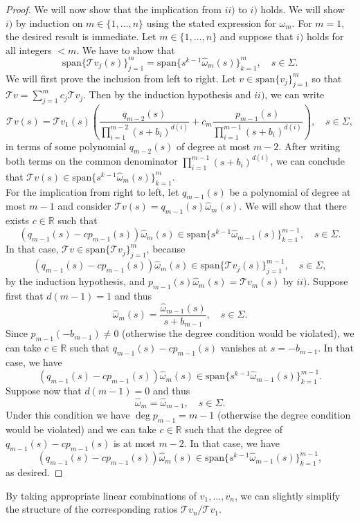 \documentclass[a4paper,12pt,oneside]{article}
\theoremstyle{definition}
\newcommand{\R}{\mathbb{R}}
\newcommand{\om}{\omega}
\newcommand{\spn}[1]{\text{span}\{#1\}}
\newcommand{\T}[1]{\mathcal{T}#1}
\begin{document}
\begin{proof}
    We will now show that the implication from $ii)$ to $i)$ holds. We will show $i)$ by induction on $m\in\{1,\dots,n\}$ using the stated expression for $\om_m$. For $m=1$, the desired result is immediate. Let $m\in\{1,\dots,n\}$ and suppose that $i)$ holds for all integers $<m$. We have to show that
        $$\spn{\T{v_j}(s)}_{j=1}^{m} = \spn{ s^{k-1} \hat{\om}_m(s)}_{k=1}^{m},\quad s\in\Sigma.$$
    We will first prove the inclusion from left to right. Let $v\in\spn{v_j}_{j=1}^m$ so that $ \T{v} = \sum_{j=1}^m c_j \T{v}_j $. Then by the induction hypothesis and $ii)$, we can write
        $$ \T{v}(s) = \T{v_1}(s) \left( \frac{q_{m-2}(s)}{\prod_{i=1}^{m-2} (s+b_i)^{d(i)}} + c_m \frac{p_{m-1}(s)}{\prod_{i=1}^{m-1} (s+b_i)^{d(i)}}\right),\quad s\in\Sigma, $$
    in terms of some polynomial $q_{m-2}(s)$ of degree at most $m-2$. After writing both terms on the common denominator $\prod_{i=1}^{m-1} (s+b_i)^{d(i)}$, we can conclude that $\T{v}(s)\in\spn{s^{k-1}\hat{\om}_m(s)}_{k=1}^m$. \\    
    For the implication from right to left, let $q_{m-1}(s)$ be a polynomial of degree at most $m-1$ and consider $\T{v}(s) = q_{m-1}(s) \hat{\om}_m(s)$. We will show that there exists $c\in\R$ such that 
    $$(q_{m-1}(s)-cp_{m-1}(s))\hat{\om}_m(s) \in\spn{s^{k-1}\hat{\om}_{m-1}(s)}_{k=1}^{m-1},\quad s\in\Sigma.$$ 
    In that case, $\T{v} \in\spn{\T{v_j}}_{j=1}^{m}$, because  
    $$(q_{m-1}(s)-cp_{m-1}(s))\hat{\om}_m(s)\in \spn{\T{v_j}(s)}_{j=1}^{m-1},\quad s\in\Sigma,$$
    by the induction hypothesis, and $ p_{m-1}(s)\hat{\om}_m(s) = \T{v_m}(s) $ by $ii)$. Suppose first that $d(m-1)=1$ and thus 
    $$\hat{\om}_m(s)=\frac{\hat{\om}_{m-1}(s)}{s+b_{m-1}},\quad s\in\Sigma.$$
    Since $p_{m-1}(-b_{m-1}) \neq 0$ (otherwise the degree condition would be violated), we can take $c\in\R$ such that $q_{m-1}(s)-cp_{m-1}(s)$ vanishes at $s=-b_{m-1}$. In that case, we have
    $$(q_{m-1}(s)-cp_{m-1}(s))\hat{\om}_m(s) \in\spn{s^{k-1}\hat{\om}_{m-1}(s)}_{k=1}^{m-1}.$$
    Suppose now that $d(m-1)=0$ and thus 
    $$\hat{\om}_{m}=\hat{\om}_{m-1},\quad s\in\Sigma.$$ 
    Under this condition we have $\deg p_{m-1}=m-1$ (otherwise the degree condition would be violated) and we can take $c\in\R$ such that the degree of $q_{m-1}(s)-cp_{m-1}(s)$ is at most $m-2$. In that case, we have 
    $$(q_{m-1}(s)-cp_{m-1}(s))\hat{\om}_m(s) \in\spn{s^{k-1}\hat{\om}_{m-1}(s)}_{k=1}^{m-1},$$
    as desired.
\end{proof}


By taking appropriate linear combinations of $v_1,\dots,v_n$, we can slightly simplify the structure of the corresponding ratios $\T{v_n}/\T{v_1}$.
\end{document}
